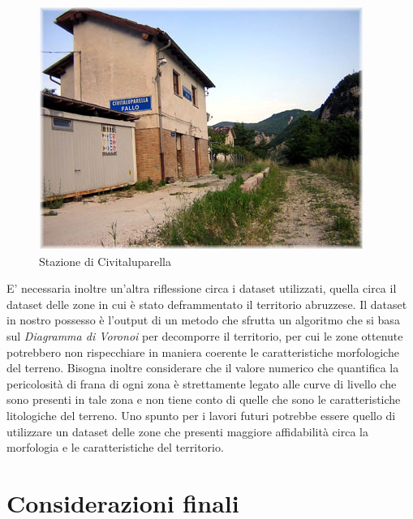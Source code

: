 \begin{figure}[h]
\begin{minipage}[c]{.40\textwidth}
\label{pettorano}
\end{minipage}%
\hspace{10mm}%
\begin{minipage}[c]{.40\textwidth}
\centering\setlength{\captionmargin}{0pt}%
\includegraphics[width=.60\textwidth]{img/civitaluparella}
\caption{Stazione di Civitaluparella}
\label{civitaluparella}
\end{minipage}
\end{figure}

E' necessaria inoltre un'altra riflessione circa i dataset utilizzati, quella circa il dataset delle zone in cui è stato deframmentato il territorio abruzzese. Il dataset in nostro possesso è l'output di un metodo che sfrutta un algoritmo che si basa sul \textit{Diagramma di Voronoi} per decomporre il territorio, per cui le zone ottenute potrebbero non rispecchiare in maniera coerente le caratteristiche morfologiche del terreno. Bisogna inoltre considerare che il valore numerico che quantifica la pericolosità di frana di ogni zona è strettamente legato alle curve di livello che sono presenti in tale zona e non tiene conto di quelle che sono le caratteristiche litologiche del terreno. 
Uno spunto per i lavori futuri potrebbe essere quello di utilizzare un dataset delle zone che presenti maggiore affidabilità circa la morfologia e le caratteristiche del territorio.
\section{Considerazioni finali}

